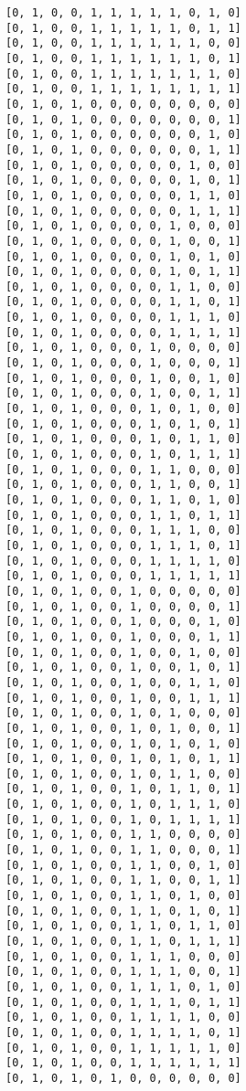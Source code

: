 \documentclass[11pt]{article}
\begin{document}
\begin{Verbatim}[commandchars=\\\{\}]
[0, 1, 0, 0, 1, 1, 1, 1, 1, 0, 1, 0]
[0, 1, 0, 0, 1, 1, 1, 1, 1, 0, 1, 1]
[0, 1, 0, 0, 1, 1, 1, 1, 1, 1, 0, 0]
[0, 1, 0, 0, 1, 1, 1, 1, 1, 1, 0, 1]
[0, 1, 0, 0, 1, 1, 1, 1, 1, 1, 1, 0]
[0, 1, 0, 0, 1, 1, 1, 1, 1, 1, 1, 1]
[0, 1, 0, 1, 0, 0, 0, 0, 0, 0, 0, 0]
[0, 1, 0, 1, 0, 0, 0, 0, 0, 0, 0, 1]
[0, 1, 0, 1, 0, 0, 0, 0, 0, 0, 1, 0]
[0, 1, 0, 1, 0, 0, 0, 0, 0, 0, 1, 1]
[0, 1, 0, 1, 0, 0, 0, 0, 0, 1, 0, 0]
[0, 1, 0, 1, 0, 0, 0, 0, 0, 1, 0, 1]
[0, 1, 0, 1, 0, 0, 0, 0, 0, 1, 1, 0]
[0, 1, 0, 1, 0, 0, 0, 0, 0, 1, 1, 1]
[0, 1, 0, 1, 0, 0, 0, 0, 1, 0, 0, 0]
[0, 1, 0, 1, 0, 0, 0, 0, 1, 0, 0, 1]
[0, 1, 0, 1, 0, 0, 0, 0, 1, 0, 1, 0]
[0, 1, 0, 1, 0, 0, 0, 0, 1, 0, 1, 1]
[0, 1, 0, 1, 0, 0, 0, 0, 1, 1, 0, 0]
[0, 1, 0, 1, 0, 0, 0, 0, 1, 1, 0, 1]
[0, 1, 0, 1, 0, 0, 0, 0, 1, 1, 1, 0]
[0, 1, 0, 1, 0, 0, 0, 0, 1, 1, 1, 1]
[0, 1, 0, 1, 0, 0, 0, 1, 0, 0, 0, 0]
[0, 1, 0, 1, 0, 0, 0, 1, 0, 0, 0, 1]
[0, 1, 0, 1, 0, 0, 0, 1, 0, 0, 1, 0]
[0, 1, 0, 1, 0, 0, 0, 1, 0, 0, 1, 1]
[0, 1, 0, 1, 0, 0, 0, 1, 0, 1, 0, 0]
[0, 1, 0, 1, 0, 0, 0, 1, 0, 1, 0, 1]
[0, 1, 0, 1, 0, 0, 0, 1, 0, 1, 1, 0]
[0, 1, 0, 1, 0, 0, 0, 1, 0, 1, 1, 1]
[0, 1, 0, 1, 0, 0, 0, 1, 1, 0, 0, 0]
[0, 1, 0, 1, 0, 0, 0, 1, 1, 0, 0, 1]
[0, 1, 0, 1, 0, 0, 0, 1, 1, 0, 1, 0]
[0, 1, 0, 1, 0, 0, 0, 1, 1, 0, 1, 1]
[0, 1, 0, 1, 0, 0, 0, 1, 1, 1, 0, 0]
[0, 1, 0, 1, 0, 0, 0, 1, 1, 1, 0, 1]
[0, 1, 0, 1, 0, 0, 0, 1, 1, 1, 1, 0]
[0, 1, 0, 1, 0, 0, 0, 1, 1, 1, 1, 1]
[0, 1, 0, 1, 0, 0, 1, 0, 0, 0, 0, 0]
[0, 1, 0, 1, 0, 0, 1, 0, 0, 0, 0, 1]
[0, 1, 0, 1, 0, 0, 1, 0, 0, 0, 1, 0]
[0, 1, 0, 1, 0, 0, 1, 0, 0, 0, 1, 1]
[0, 1, 0, 1, 0, 0, 1, 0, 0, 1, 0, 0]
[0, 1, 0, 1, 0, 0, 1, 0, 0, 1, 0, 1]
[0, 1, 0, 1, 0, 0, 1, 0, 0, 1, 1, 0]
[0, 1, 0, 1, 0, 0, 1, 0, 0, 1, 1, 1]
[0, 1, 0, 1, 0, 0, 1, 0, 1, 0, 0, 0]
[0, 1, 0, 1, 0, 0, 1, 0, 1, 0, 0, 1]
[0, 1, 0, 1, 0, 0, 1, 0, 1, 0, 1, 0]
[0, 1, 0, 1, 0, 0, 1, 0, 1, 0, 1, 1]
[0, 1, 0, 1, 0, 0, 1, 0, 1, 1, 0, 0]
[0, 1, 0, 1, 0, 0, 1, 0, 1, 1, 0, 1]
[0, 1, 0, 1, 0, 0, 1, 0, 1, 1, 1, 0]
[0, 1, 0, 1, 0, 0, 1, 0, 1, 1, 1, 1]
[0, 1, 0, 1, 0, 0, 1, 1, 0, 0, 0, 0]
[0, 1, 0, 1, 0, 0, 1, 1, 0, 0, 0, 1]
[0, 1, 0, 1, 0, 0, 1, 1, 0, 0, 1, 0]
[0, 1, 0, 1, 0, 0, 1, 1, 0, 0, 1, 1]
[0, 1, 0, 1, 0, 0, 1, 1, 0, 1, 0, 0]
[0, 1, 0, 1, 0, 0, 1, 1, 0, 1, 0, 1]
[0, 1, 0, 1, 0, 0, 1, 1, 0, 1, 1, 0]
[0, 1, 0, 1, 0, 0, 1, 1, 0, 1, 1, 1]
[0, 1, 0, 1, 0, 0, 1, 1, 1, 0, 0, 0]
[0, 1, 0, 1, 0, 0, 1, 1, 1, 0, 0, 1]
[0, 1, 0, 1, 0, 0, 1, 1, 1, 0, 1, 0]
[0, 1, 0, 1, 0, 0, 1, 1, 1, 0, 1, 1]
[0, 1, 0, 1, 0, 0, 1, 1, 1, 1, 0, 0]
[0, 1, 0, 1, 0, 0, 1, 1, 1, 1, 0, 1]
[0, 1, 0, 1, 0, 0, 1, 1, 1, 1, 1, 0]
[0, 1, 0, 1, 0, 0, 1, 1, 1, 1, 1, 1]
[0, 1, 0, 1, 0, 1, 0, 0, 0, 0, 0, 0]

\end{Verbatim}
\end{document}

